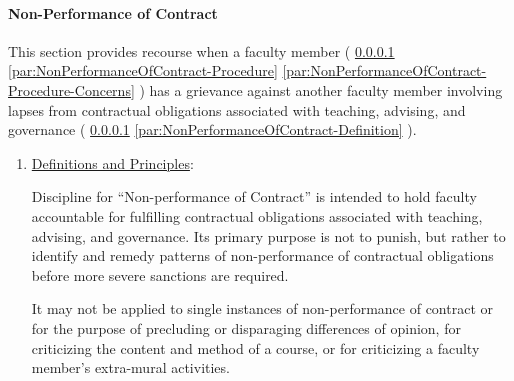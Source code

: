 			\paragraph{Non-Performance of Contract}
				\label{sec:NonPerformanceOfContract}
				This section provides recourse when a faculty member (
				\ref{sec:NonPerformanceOfContract}
				\ref{par:NonPerformanceOfContract-Procedure}
				\ref{par:NonPerformanceOfContract-Procedure-Concerns}
				) has a grievance against another faculty member involving lapses from contractual obligations associated with teaching, advising, and governance (
				\ref{sec:NonPerformanceOfContract}
				\ref{par:NonPerformanceOfContract-Definition}
				).
				\begin{enumerate}[label=\alph*)]
					\item{\underline{Definitions and Principles}:}
					\label{par:NonPerformanceOfContract-Definition}

					Discipline for ``Non-performance of Contract'' is intended
					to hold faculty accountable for fulfilling contractual
					obligations associated with teaching, advising, and
					governance.  Its primary purpose is not to punish, but
					rather to identify and remedy patterns of non-performance of
					contractual obligations before more severe sanctions are
					required.

					It may not be applied to single instances of non-performance
					of contract or for the purpose of precluding or disparaging
					differences of opinion, for criticizing the content and
					method of a course, or for criticizing a faculty member's
					extra-mural activities.


\end{enumerate}
